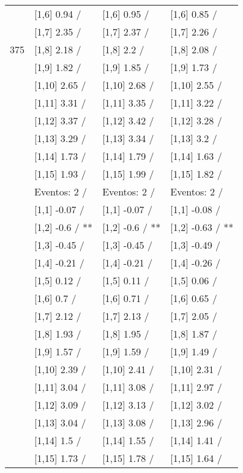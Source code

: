 \begin{table}
\begin{tabular}[t]{llll}
 & {}[1,6] 0.94  / & {}[1,6] 0.95  / & {}[1,6] 0.85  /\\
 & {}[1,7] 2.35  / & {}[1,7] 2.37  / & {}[1,7] 2.26  /\\
375 & {}[1,8] 2.18  / & {}[1,8] 2.2  / & {}[1,8] 2.08  /\\
\addlinespace
 & {}[1,9] 1.82  / & {}[1,9] 1.85  / & {}[1,9] 1.73  /\\
 & {}[1,10] 2.65  / & {}[1,10] 2.68  / & {}[1,10] 2.55  /\\
 & {}[1,11] 3.31  / & {}[1,11] 3.35  / & {}[1,11] 3.22  /\\
 & {}[1,12] 3.37  / & {}[1,12] 3.42  / & {}[1,12] 3.28  /\\
 & {}[1,13] 3.29  / & {}[1,13] 3.34  / & {}[1,13] 3.2  /\\
\addlinespace
 & {}[1,14] 1.73  / & {}[1,14] 1.79  / & {}[1,14] 1.63  /\\
 & {}[1,15] 1.93  / & {}[1,15] 1.99  / & {}[1,15] 1.82  /\\
 & Eventos:  2 / & Eventos:  2 / & Eventos:  2 /\\
 & {}[1,1] -0.07  / & {}[1,1] -0.07  / & {}[1,1] -0.08  /\\
 & {}[1,2] -0.6  / ** & {}[1,2] -0.6  / ** & {}[1,2] -0.63  / **\\
\addlinespace
 & {}[1,3] -0.45  / & {}[1,3] -0.45  / & {}[1,3] -0.49  /\\
 & {}[1,4] -0.21  / & {}[1,4] -0.21  / & {}[1,4] -0.26  /\\
 & {}[1,5] 0.12  / & {}[1,5] 0.11  / & {}[1,5] 0.06  /\\
 & {}[1,6] 0.7  / & {}[1,6] 0.71  / & {}[1,6] 0.65  /\\
 & {}[1,7] 2.12  / & {}[1,7] 2.13  / & {}[1,7] 2.05  /\\
\addlinespace
500 & {}[1,8] 1.93  / & {}[1,8] 1.95  / & {}[1,8] 1.87  /\\
 & {}[1,9] 1.57  / & {}[1,9] 1.59  / & {}[1,9] 1.49  /\\
 & {}[1,10] 2.39  / & {}[1,10] 2.41  / & {}[1,10] 2.31  /\\
 & {}[1,11] 3.04  / & {}[1,11] 3.08  / & {}[1,11] 2.97  /\\
 & {}[1,12] 3.09  / & {}[1,12] 3.13  / & {}[1,12] 3.02  /\\
\addlinespace
 & {}[1,13] 3.04  / & {}[1,13] 3.08  / & {}[1,13] 2.96  /\\
 & {}[1,14] 1.5  / & {}[1,14] 1.55  / & {}[1,14] 1.41  /\\
 & {}[1,15] 1.73  / & {}[1,15] 1.78  / & {}[1,15] 1.64  /\\
\bottomrule
\end{tabular}
\end{table}
